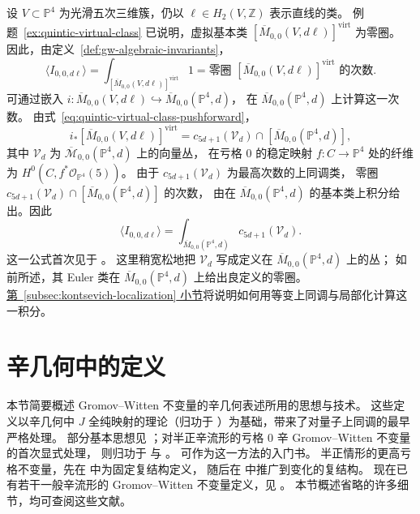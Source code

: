 \begin{example}\label{ex:quintic-gw-euler-integral}
设 $V\subset\mathbb P^4$ 为光滑五次三维簇，仍以 $\ell\in H_2(V,\mathbb Z)$ 表示直线的类。
例题~\ref{ex:quintic-virtual-class} 已说明，虚拟基本类
$[\overline M_{0,0}(V,d\ell)]^{\mathrm{virt}}$ 为零圈。
因此，由定义~\ref{def:gw-algebraic-invariants}，
\[
\langle I_{0,0,d\ell}\rangle
=\int_{[\overline M_{0,0}(V,d\ell)]^{\mathrm{virt}}}1
=\text{零圈 }[\overline M_{0,0}(V,d\ell)]^{\mathrm{virt}}\text{ 的次数}.
\]
可通过嵌入 $i:\overline M_{0,0}(V,d\ell)\hookrightarrow\overline M_{0,0}(\mathbb P^4,d)$，
在 $\overline M_{0,0}(\mathbb P^4,d)$ 上计算这一次数。
由式~\eqref{eq:quintic-virtual-class-pushforward}，
\[
i_*[\overline M_{0,0}(V,d\ell)]^{\mathrm{virt}}
=c_{5d+1}(\mathcal V_d)\cap[\overline M_{0,0}(\mathbb P^4,d)],
\]
其中 $\mathcal V_d$ 为 $\overline{\mathcal M}_{0,0}(\mathbb P^4,d)$ 上的向量丛，
在亏格 $0$ 的稳定映射 $f:C\to\mathbb P^4$ 处的纤维为 $H^0(C,f^*\mathcal O_{\mathbb P^4}(5))$。
由于 $c_{5d+1}(\mathcal V_d)$ 为最高次数的上同调类，
零圈 $c_{5d+1}(\mathcal V_d)\cap[\overline M_{0,0}(\mathbb P^4,d)]$ 的次数，
由在 $\overline M_{0,0}(\mathbb P^4,d)$ 的基本类上积分给出。因此
\[
\langle I_{0,0,d\ell}\rangle
=\int_{\overline M_{0,0}(\mathbb P^4,d)}c_{5d+1}(\mathcal V_d).
\]
这一公式首次见于 。
这里稍宽松地把 $\mathcal V_d$ 写成定义在 $\overline M_{0,0}(\mathbb P^4,d)$ 上的丛；
如前所述，其 Euler 类在 $\overline M_{0,0}(\mathbb P^4,d)$ 上给出良定义的零圈。
\hyperref[subsec:kontsevich-localization]{第~\ref*{subsec:kontsevich-localization} 小节}将说明如何用等变上同调与局部化计算这一积分。
\end{example}

\section{辛几何中的定义}\label{sec:gw-symplectic-definition}
本节简要概述 Gromov--Witten 不变量的辛几何表述所用的思想与技术。
这些定义以辛几何中 $J$ 全纯映射的理论（归功于 ）为基础，带来了对量子上同调的最早严格处理。
部分基本思想见 ；对半正辛流形的亏格 $0$ 辛 Gromov--Witten 不变量的首次显式处理，
则归功于  与 。 可作为这一方法的入门书。
半正情形的更高亏格不变量，先在  中为固定复结构定义，
随后在  中推广到变化的复结构。
现在已有若干一般辛流形的 Gromov--Witten 不变量定义，见 。
本节概述省略的许多细节，均可查阅这些文献。

